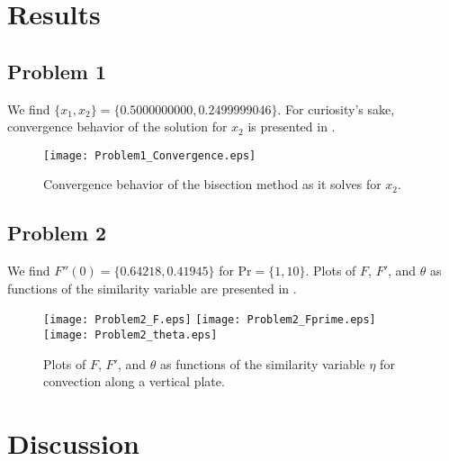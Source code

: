 \documentclass[12pt]{article}
\begin{document}
\section{Results} %

\subsection{Problem 1}

We find $\{ x_1, x_2 \} = \{ 0.5000000000, 0.2499999046 \}$. For curiosity's sake, convergence behavior of the solution for $x_2$ is presented in .

\begin{figure}[h!]
\begin{center}
\texttt{[image: Problem1\_Convergence.eps]}
\\
\caption{Convergence behavior of the bisection method as it solves for $x_2$.}
\label{fig:prob1_convergence}
\end{center}
\end{figure}

\subsection{Problem 2}

We find $F''(0) = \{0.64218, 0.41945\}$ for $\text{Pr} = \{1, 10\}$. Plots of $F$, $F'$, and $\theta$ as functions of the similarity variable are presented in .

\begin{figure}[h!]
\begin{center}
\texttt{[image: Problem2\_F.eps]}
\texttt{[image: Problem2\_Fprime.eps]}
\texttt{[image: Problem2\_theta.eps]}
\\
\caption{Plots of $F$, $F'$, and $\theta$ as functions of the similarity variable $\eta$ for convection along a vertical plate.}
\label{fig:prob2_plots}
\end{center}
\end{figure}

\section{Discussion} %
\end{document}
